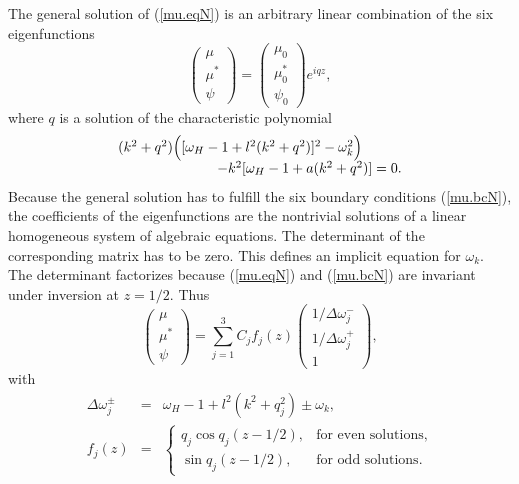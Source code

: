 The general solution of (\ref{mu.eqN}) is an arbitrary linear
combination of the six eigenfunctions 
\begin{displaymath}
 \left(\begin{array}{c}\mu\\\mu^*\\\psi\end{array}\right)=\left(
   \begin{array}{c}\mu_0\\\mu^*_0\\\psi_0\end{array}\right)e^{iqz},
\end{displaymath}
where $q$ is a solution of the characteristic polynomial
\begin{equation}\begin{array}{r}
 (k^2+q^2)\Bigl([\omega_H-1+l^2(k^2+q^2)]^2-\omega_k^2\Bigr)
   \hspace{10mm}\\-k^2[\omega_H-1+a(k^2+q^2)]=0.\end{array}
  \label{q.eq}
\end{equation}
Because the general solution has to fulfill the six boundary
conditions (\ref{mu.bcN}), the coefficients of the eigenfunctions are
the nontrivial solutions of a linear homogeneous system of algebraic
equations. The determinant of the corresponding matrix has to be
zero. This defines an implicit equation for $\omega_k$. 
The determinant factorizes because (\ref{mu.eqN}) 
and (\ref{mu.bcN}) are invariant under inversion at $z=1/2$. Thus
\begin{equation}
 \left(\begin{array}{c}\mu\\\mu^*\\\psi\end{array}\right)=
   \sum_{j=1}^3C_jf_j(z)\left(\begin{array}{c}
      1/\Delta\omega_j^-\\1/\Delta\omega_j^+\\1\end{array}\right),
  \label{mu.sol}
\end{equation}
with
\begin{eqnarray}
  \Delta\omega_j^\pm&=&\omega_H-1+l^2(k^2+q_j^2)\pm\omega_k,
  \label{mu.c.wj}\\
  f_j(z)&=&\left\{\begin{array}{ll}q_j\cos q_j(z-1/2),&
   \mbox{for even solutions},\\
   \sin q_j(z-1/2),&\mbox{for odd solutions}.\end{array}\right.
  \label{mu.c.fj}
\end{eqnarray}
